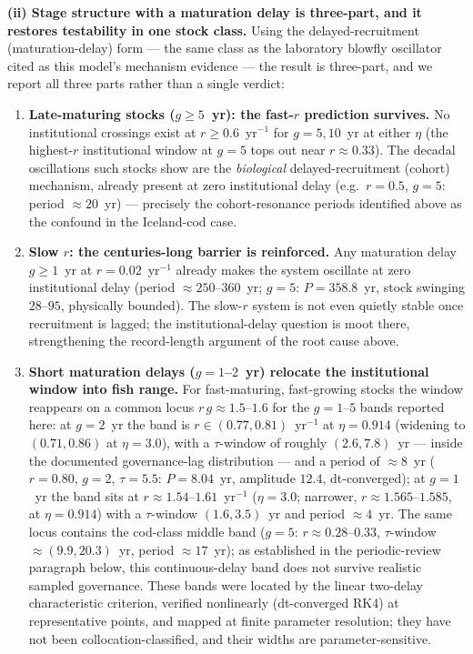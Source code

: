 \documentclass[twocolumn,10pt]{article}
\begin{document}
\textbf{(ii) Stage structure with a maturation delay is three-part, and it restores testability in one stock class.} Using the delayed-recruitment (maturation-delay) form --- the same class as the laboratory blowfly oscillator cited as this model's mechanism evidence \cite{gurney1980} --- the result is three-part, and we report all three parts rather than a single verdict:
\begin{enumerate}
\item \textbf{Late-maturing stocks ($g\ge5$~yr): the fast-$r$ prediction survives.} No institutional crossings exist at $r\ge0.6$~yr$^{-1}$ for $g=5,10$~yr at either $\eta$ (the highest-$r$ institutional window at $g=5$ tops out near $r\approx0.33$). The decadal oscillations such stocks show are the \emph{biological} delayed-recruitment (cohort) mechanism, already present at zero institutional delay (e.g.\ $r=0.5$, $g=5$: period $\approx20$~yr) --- precisely the cohort-resonance periods identified above as the confound in the Iceland-cod case.
\item \textbf{Slow $r$: the centuries-long barrier is reinforced.} Any maturation delay $g\ge1$~yr at $r=0.02$~yr$^{-1}$ already makes the system oscillate at zero institutional delay (period $\approx250$--$360$~yr; $g=5$: $P=358.8$~yr, stock swinging $28$--$95$, physically bounded). The slow-$r$ system is not even quietly stable once recruitment is lagged; the institutional-delay question is moot there, strengthening the record-length argument of the root cause above.
\item \textbf{Short maturation delays ($g=1$--$2$~yr) relocate the institutional window into fish range.} For fast-maturing, fast-growing stocks the window reappears on a common locus $r\,g\approx1.5$--$1.6$ for the $g=1$--$5$ bands reported here: at $g=2$~yr the band is $r\in(0.77,0.81)$~yr$^{-1}$ at $\eta=0.914$ (widening to $(0.71,0.86)$ at $\eta=3.0$), with a $\tau$-window of roughly $(2.6,7.8)$~yr --- inside the documented governance-lag distribution \cite{hocherman2025} --- and a period of $\approx8$~yr ($r=0.80$, $g=2$, $\tau=5.5$: $P=8.04$~yr, amplitude $12.4$, dt-converged); at $g=1$~yr the band sits at $r\approx1.54$--$1.61$~yr$^{-1}$ ($\eta=3.0$; narrower, $r\approx1.565$--$1.585$, at $\eta=0.914$) with a $\tau$-window $(1.6,3.5)$~yr and period $\approx4$~yr. The same locus contains the cod-class middle band ($g=5$: $r\approx0.28$--$0.33$, $\tau$-window $\approx(9.9,20.3)$~yr, period $\approx17$~yr); as established in the periodic-review paragraph below, this continuous-delay band does not survive realistic sampled governance. These bands were located by the linear two-delay characteristic criterion, verified nonlinearly (dt-converged RK4) at representative points, and mapped at finite parameter resolution; they have not been collocation-classified, and their widths are parameter-sensitive.
\end{enumerate}
\end{document}
